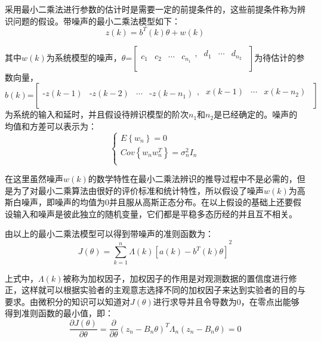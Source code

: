 采用最小二乘法进行参数的估计时是需要一定的前提条件的，这些前提条件称为辨识问题的假设。带噪声的最小二乘法模型如下：
\begin{equation}
z\left( k \right)={{b}^{T}}(k)\theta +w(k)
\end{equation}

其中$w(k)$为系统模型的噪声，$\theta \text{=}\left[ \begin{matrix}
   {{c}_{1}} & {{c}_{2}} & \cdots  & {{c}_{{{n}_{1}}}}\begin{matrix}
   , & {{d}_{1}} & \cdots  & {{d}_{{{n}_{2}}}}  \\
\end{matrix}  \\
\end{matrix} \right]$为待估计的参数向量，$b(k)\text{=}\left[ \begin{matrix}
   \text{-}z\left( k-1 \right) & \text{-}z\left( k-2 \right) & \cdots  & \text{-}z\left( k-{{n}_{1}} \right)\begin{matrix}
   , & x\left( k-1 \right) & \cdots  & x\left( k-{{n}_{2}} \right)  \\
\end{matrix}  \\
\end{matrix} \right]$为系统的输入和延时，并且假设待辨识模型的阶次${{n}_{1}}$和${{n}_{2}}$是已经确定的。噪声的均值和方差可以表示为：
\begin{equation}
\left\{  \begin{array}{l}
   E\left\{ {{w}_{n}} \right\}=0 \\ 
  Cov\left\{ {{w}_{n}}w_{n}^{T} \right\}=\sigma _{n}^{2}{{I}_{n}} \\ 
\end{array} \right.
\end{equation}

在这里虽然噪声$w(k)$的数学特性在最小二乘法辨识的推导过程中不是必需的，但是为了对最小二乘算法由很好的评价标准和统计特性，所以假设了噪声$w(k)$为高斯白噪声，即噪声的均值为0并且服从高斯正态分布。在以上假设的基础上还要假设输入和噪声是彼此独立的随机变量，它们都是平稳多态历经的并且互不相关。

由以上的最小二乘法模型可以得到带噪声的准则函数为：
\begin{equation}
J\left( \theta  \right)={{\sum\limits_{k=1}^{n}{\Lambda \left( k \right)\left[ a(k)-{{b}^{T}}(k)\theta  \right]}}^{2}}
\end{equation}

上式中，$\Lambda \left( k \right)$被称为加权因子，加权因子的作用是对观测数据的置信度进行修正，这样就可以根据实验者的主观意志选择不同的加权因子来达到实验者的目的与要求。由微积分的知识可以知道对$J\left( \theta  \right)$进行求导并且令导数为0，在零点出能够得到准则函数的最小值，即：
\begin{equation}
\frac{\partial J\left( \theta  \right)}{\partial \theta }=\frac{\partial }{\partial \theta }{{\left( {{z}_{n}}-{{B}_{n}}\theta  \right)}^{T}}{{\Lambda }_{n}}\left( {{z}_{n}}-{{B}_{n}}\theta  \right)=0
\end{equation}

